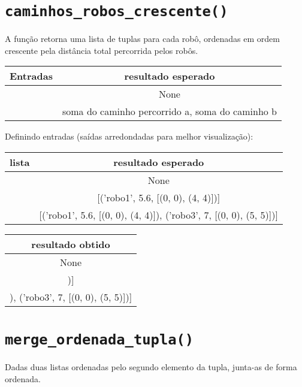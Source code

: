 \begin{apendicesenv}
\section{\texttt{caminhos\_robos\_crescente()}}
A função retorna uma lista de tuplas para cada robô, ordenadas em ordem crescente pela distância total percorrida pelos robôs.

\begin{center}
    \begin{tabular}{|c|c|}
        \cline{1-2}
        Entradas & resultado esperado \\ \hline
        [] &  None\\ \hline
        [(a),(b)] & soma do caminho percorrido a, soma do caminho b  \\ \hline
    \end{tabular}
\end{center}


Definindo entradas (saídas arredondadas para melhor visualização):

\begin{center}
    \begin{tabular}{|c|c|}
        \cline{1-2}
        lista & resultado esperado \\ \hline
        [] & None \\ \hline
        [('robo1',2,(4,4),5)] & [('robo1', 5.6, [(0, 0), (4, 4)])] \\ \hline
        [('robo1',2,(4,4),5),('robo3',7,(5,5),2)] & [('robo1', 5.6, [(0, 0), (4, 4)]), ('robo3', 7, [(0, 0), (5, 5)])] \\ \hline
    \end{tabular}
\end{center} 

\begin{center}
    \begin{tabular}{|c|}
        \cline{1-1}
        resultado obtido \\ \hline
        None \\ \hline
        [('robo1', 5.6, [(0, 0), (4, 4)])] \\ \hline
        [('robo1', 5.6, [(0, 0), (4, 4)]), ('robo3', 7, [(0, 0), (5, 5)])] \\ \hline
    \end{tabular}
\end{center}



\section{\texttt{merge\_ordenada\_tupla()}}
Dadas duas listas ordenadas pelo segundo elemento da tupla, junta-as de forma ordenada.


\end{apendicesenv}
